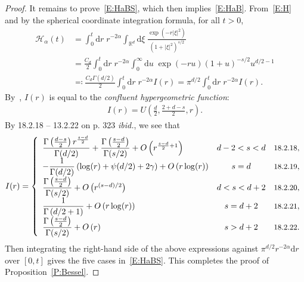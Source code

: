 \documentclass[sn-mathphys]{sn-jnl}%
\renewcommand{\R}{\mathbb{R}}
\newcommand{\ud}{\ensuremath{\mathrm{d}}}
\numberwithin{equation}{section}
\theoremstyle{thmstyleone}%
\theoremstyle{thmstyletwo}%
\theoremstyle{thmstylethree}%
\begin{document}
\begin{proof}
  It remains to prove~\eqref{E:HaBS}, which then implies~\eqref{E:HaB}. From~\eqref{E:H} and by the
  spherical coordinate integration formula, for all $t>0$,
  \begin{align*}
    \mathcal{H}_{\alpha}(t)
    & = \int_0^t \ud r \; r^{-2\alpha} \int_{\R^d} \ud \xi \; \frac{\exp(-r\lvert\xi\rvert^2)}{(1+\lvert\xi\rvert^2)^{s/2}} \\
    & = \frac{C_d}{2} \int_0^t \ud r \; r^{-2\alpha} \int_0^\infty \ud u \; \exp(-r u)(1+u)^{-s/2} u^{d/2-1} \\
    & \eqqcolon \frac{C_d \Gamma\left(d/2\right)}{2} \int_0^t \ud r \; r^{-2\alpha} I(r) = \pi^{d/2}\int_0^t \ud r \; r^{-2\alpha} I(r).
  \end{align*}
  By~\cite[13.4.4 on p.326]{olver.lozier.ea:10:nist}, $I(r)$ is equal to the \textit{confluent
  hypergeometric function}:
  \begin{align}\label{E:ConHyGe}
    I(r) =U\left(\frac{d}{2},\frac{2+d-s}{2},r\right).
  \end{align}
  By 18.2.18 -- 13.2.22 on p. 323 \textit{ibid.}, we see that \renewcommand{\arraystretch}{2}
  \begin{align*}
    I(r) = \left\{
      \begin{array}{lcl}
        \dfrac{\Gamma\left(\frac{d-s}{2}\right)r^{\frac{s-d}{2}}}{\Gamma(d/2)}+\dfrac{\Gamma\left(\frac{s-d}{2}\right)}{\Gamma(s/2)} + O\left(r^{\frac{s-d}{2}+1}\right) & d-2<s<d & \text{\small 18.2.18}, \\
        -\dfrac{1}{\Gamma(d/2)}\left(\log(r) + \psi(d/2) + 2\gamma \right) +O\left(r\log(r)\right)                                                                       & s=d     & \text{\small 18.2.19}, \\
        \dfrac{\Gamma\left(\frac{s-d}{2}\right)}{\Gamma(s/2)} + O\left(r^{(s-d)/2}\right)                                                                                & d<s<d+2 & \text{\small 18.2.20}, \\
        \dfrac{1}{\Gamma\left(d/2+1\right)} + O\left(r\log(r)\right)                                                                                                     & s=d+2   & \text{\small 18.2.21}, \\
        \dfrac{\Gamma\left(\frac{s-d}{2}\right)}{\Gamma(s/2)} + O\left(r\right)                                                                                          & s>d+2   & \text{\small 18.2.22}. \\
      \end{array}
      \right.
  \end{align*}
  Then integrating the right-hand side of the above expressions against $\pi^{d/2}r^{-2\alpha}\ud r$
  over $[0,t]$ gives the five cases in~\eqref{E:HaBS}. This completes the proof of
  Proposition~\ref{P:Bessel}.
\end{proof}
\end{document}
